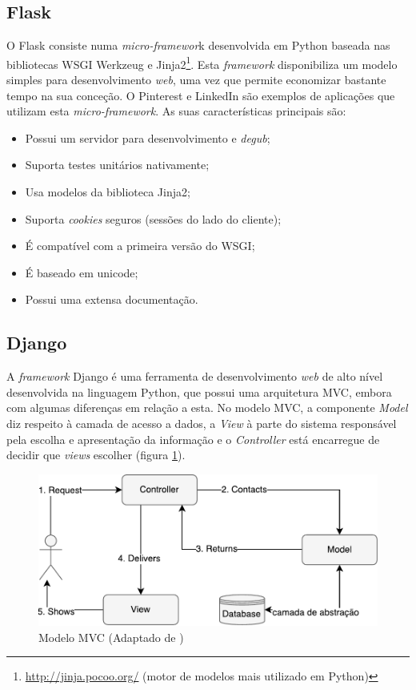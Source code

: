 \subsection{Flask}


O Flask consiste numa \textit{micro-framewor}k desenvolvida em Python baseada nas bibliotecas \ac{WSGI} Werkzeug e Jinja2\footnote{\url{http://jinja.pocoo.org/} (motor de modelos mais utilizado em Python)}. Esta \textit{framework} disponibiliza um  modelo simples para desenvolvimento \textit{web}, uma vez que permite economizar bastante tempo na sua conceção. O Pinterest e LinkedIn são exemplos de aplicações que utilizam esta \textit{micro-framework}. As suas características principais são\cite{Flask2014}:  


\begin{itemize}
	\item Possui um servidor para desenvolvimento e \textit{degub}; 
	\item Suporta testes unitários nativamente; 
	\item Usa modelos da biblioteca Jinja2; 
	\item Suporta \textit{cookies} seguros (sessões do lado do cliente); 
	\item É compatível com a primeira versão do \ac{WSGI}; 
	\item É baseado em unicode; 
	\item Possui uma extensa documentação.
\end{itemize}




\subsection{Django}
\label{django}

A \textit{framework} Django é uma ferramenta de desenvolvimento \textit{web} de alto nível desenvolvida na linguagem Python, que possui uma arquitetura \ac{MVC}\cite{Deacon2005}, embora com algumas diferenças em relação a esta. No modelo \ac{MVC}, a componente \textit{Model} diz respeito à camada de acesso a dados, a \textit{View} à parte do sistema responsável pela escolha e apresentação da informação e o \textit{Controller} está encarregue de decidir que \textit{views} escolher (figura \ref{mvcdiag}). 



\begin{figure}[!htb]
	\centering
	\includegraphics[scale=0.7]{esquemas/MVC-diagram.pdf}
	\caption[]{Modelo \ac{MVC} (Adaptado de \cite{Sugrue2013})}
	\label{mvcdiag}
\end{figure}

